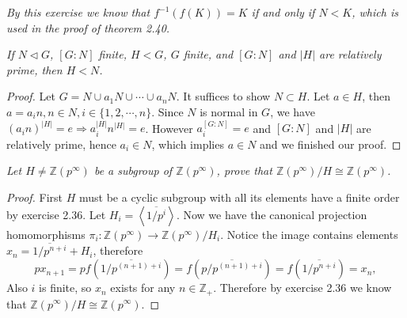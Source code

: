 \begin{note}\em
By this exercise we know that $f^{-1}(f(K))=K$ if and only if $N<K$, which is used in the proof of theorem 2.40.
\end{note}
\begin{problem}\em
If $N\lhd G$, $[G:N]$ finite, $H<G$, $G$ finite, and $[G:N]$ and $|H|$ are relatively prime, then $H<N$.
\end{problem}
\begin{proof}
Let $G=N\cup a_1N\cup \cdots \cup a_nN$. It suffices to show $N\subset H$. Let $a\in H$, then $a=a_in,n\in N,i\in\{1,2,\cdots,n\}$. Since $N$ is normal in $G$, we have $(a_in)^{|H|}=e\Rightarrow a_i^{|H|}n^{|H|}=e$. However $a_i^{[G:N]}=e$ and $[G:N]$ and $|H|$ are relatively prime, hence $a_i\in N$, which implies $a\in N$ and we finished our proof.
\end{proof}
\begin{problem}\em
Let $H\ne\mathbb{Z}(p^\infty)$ be a subgroup of $\mathbb{Z}(p^\infty)$, prove that $\mathbb{Z}(p^\infty)/H\cong\mathbb{Z}(p^{\infty})$.
\end{problem}
\begin{proof}
First $H$ must be a cyclic subgroup with all its elements have a finite order by exercise 2.36. Let $H_i=\left<\overline{1/p^i}\right>$. Now we have the canonical projection homomorphisms $\pi_i:\mathbb{Z}(p^\infty)\to\mathbb{Z}(p^\infty)/H_i$. Notice the image contains elements $x_n=\overline{1/p^{n+i}}+H_i$, therefore
$$
px_{n+1}=pf\left( \overline{1/p^{\left( n+1 \right) +i}} \right) =f\left( \overline{p/p^{\left( n+1 \right) +i}} \right) =f\left( \overline{1/p^{n+i}} \right) =x_n,
$$
Also $i$ is finite, so $x_n$ exists for any $n\in\mathbb{Z}_+$. Therefore by exercise 2.36 we know that $\mathbb{Z}(p^\infty)/H\cong\mathbb{Z}(p^{\infty})$.
\end{proof}
